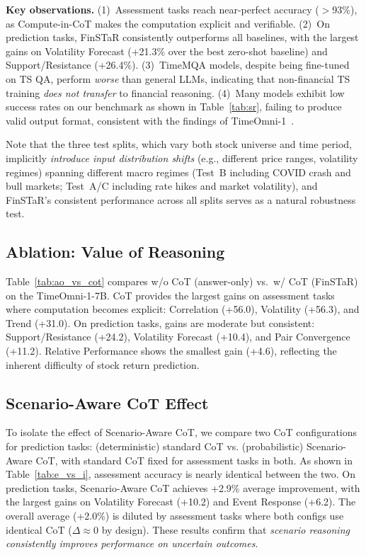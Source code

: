 \textbf{Key observations.}
(1)~Assessment tasks reach near-perfect accuracy ($>$93\%), as Compute-in-CoT makes the computation explicit and verifiable.
(2)~On prediction tasks, FinSTaR consistently outperforms all baselines, with the largest gains on Volatility Forecast (+21.3\% over the best zero-shot baseline) and Support/Resistance (+26.4\%).
(3)~TimeMQA models, despite being fine-tuned on TS QA, perform \textit{worse} than general LLMs, indicating that non-financial TS training \textit{does not transfer} to financial reasoning.
(4)~Many models exhibit low success rates on our benchmark as shown in Table~\ref{tab:sr}, failing to produce valid output format, consistent with the findings of TimeOmni-1~\cite{timeomni1}.

Note that the three test splits, which vary both stock universe and time period, implicitly \textit{introduce input distribution shifts} (e.g., different price ranges, volatility regimes) spanning different macro regimes (Test~B
including COVID crash and bull markets; Test~A/C
including rate hikes and market volatility), and FinSTaR's consistent performance across all splits serves as a natural robustness test.

\subsection{Ablation: Value of Reasoning}
\vspace{-3pt}
Table~\ref{tab:ao_vs_cot} compares w/o CoT (answer-only) vs.\ w/ CoT (FinSTaR) on the TimeOmni-1-7B. %
CoT provides the largest gains on assessment tasks where computation becomes explicit: Correlation (+56.0), Volatility (+56.3), and Trend (+31.0).
On prediction tasks, gains are moderate but consistent: Support/Resistance (+24.2), Volatility Forecast (+10.4), and Pair Convergence (+11.2).
Relative Performance shows the smallest gain (+4.6), reflecting the inherent difficulty of stock return prediction.

\subsection{Scenario-Aware CoT Effect}
To isolate the effect of Scenario-Aware CoT, we compare two CoT configurations for prediction tasks: (deterministic) standard CoT vs. (probabilistic) Scenario-Aware CoT, 
with standard CoT fixed for assessment tasks in both.
As shown in Table~\ref{tab:e_vs_i}, assessment accuracy is nearly identical between the two.
On prediction tasks, Scenario-Aware CoT achieves +2.9\% average improvement, with the largest gains on Volatility Forecast (+10.2) and Event Response (+6.2).
The overall average (+2.0\%) is diluted by assessment tasks where both configs use identical CoT ($\Delta \approx 0$ by design).
These results confirm that \textit{scenario reasoning consistently improves performance on uncertain outcomes}.


